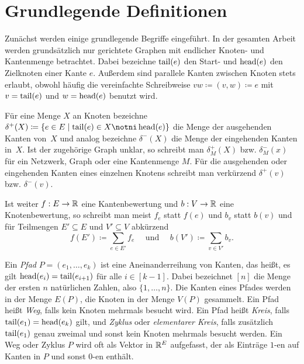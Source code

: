 \section{Grundlegende Definitionen}

Zunächst werden einige grundlegende Begriffe eingeführt.
In der gesamten Arbeit werden grundsätzlich nur gerichtete Graphen mit endlicher Knoten- und Kantenmenge betrachtet.
Dabei bezeichne $\operatorname{tail}(e)$ den Start- und $\operatorname{head}(e)$ den Zielknoten einer Kante $e$.
Außerdem sind parallele Kanten zwischen Knoten stets erlaubt, obwohl häufig die vereinfachte Schreibweise $vw\coloneq (v,w)\coloneq e$ mit $v=\operatorname{tail}(e)$ und $w=\operatorname{head}(e)$ benutzt wird.

Für eine Menge $X$ an Knoten bezeichne $\delta^+(X)\coloneq \{ e\in E \mid \tail(e) \in X \notni \head(e) \}$ die Menge der ausgehenden Kanten von~$X$ und analog bezeichne $\delta^-(X)$ die Menge der eingehenden Kanten in~$X$.
Ist der zugehörige Graph unklar, so schreibt man $\delta^+_M(X)$ bzw. $\delta^-_M(x)$ für ein Netzwerk, Graph oder eine Kantenmenge $M$.
Für die ausgehenden oder eingehenden Kanten eines einzelnen Knotens schreibt man verkürzend $\delta^+(v)$ bzw. $\delta^-(v)$.

Ist weiter $f: E \rightarrow \mathbb{R}$ eine Kantenbewertung und $b: V \rightarrow \mathbb{R}$ eine Knotenbewertung, so schreibt man meist $f_e$ statt $f(e)$ und $b_v$ statt $b(v)$ und für Teilmengen $E'\subseteq E$ und $V'\subseteq V$ abkürzend
\[ 
	f(E')\coloneq \sum_{e \in E'} f_e \text{~~~ und ~~~} b(V')\coloneq\sum_{v\in V'} b_v.
\]

Ein \emph{Pfad} $P=(e_1, \dots, e_k)$ ist eine Aneinanderreihung von Kanten, das heißt, es gilt $\operatorname{head}(e_i) = \operatorname{tail}(e_{i+1})$ für alle $i\in[k-1]$.
Dabei bezeichnet $[n]$ die Menge der ersten $n$ natürlichen Zahlen, also $\{ 1,\dots, n \}$.
Die Kanten eines Pfades werden in der Menge $E(P)$, die Knoten in der Menge $V(P)$ gesammelt.
Ein Pfad heißt \emph{Weg}, falls kein Knoten mehrmals besucht wird. 
Ein Pfad heißt \emph{Kreis}, falls $\operatorname{tail}(e_1) = \operatorname{head}(e_k)$ gilt, und \emph{Zyklus} oder \emph{elementarer Kreis}, falls zusätzlich $\operatorname{tail}(e_1)$ genau zweimal und sonst kein Knoten mehrmals besucht werden.
Ein Weg oder Zyklus $P$ wird oft als Vektor in $\mathbb{R}^E$ aufgefasst, der als Einträge $1$-en auf Kanten in $P$ und sonst $0$-en enthält.

